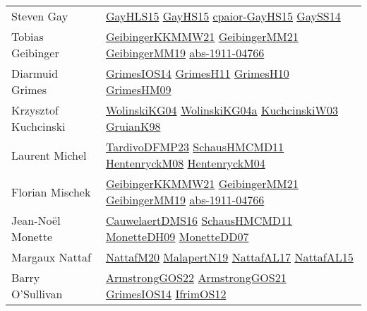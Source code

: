 {\begin{longtable}{p{4cm}p{20cm}}
Steven Gay & \href{papers/GayHLS15.pdf}{GayHLS15}\cite{GayHLS15} \href{papers/GayHS15.pdf}{GayHS15}\cite{GayHS15} \href{papers/cpaior-GayHS15.pdf}{cpaior-GayHS15}\cite{cpaior-GayHS15} \href{papers/GaySS14.pdf}{GaySS14}\cite{GaySS14} \\
Tobias Geibinger & \href{papers/GeibingerKKMMW21.pdf}{GeibingerKKMMW21}\cite{GeibingerKKMMW21} \href{papers/GeibingerMM21.pdf}{GeibingerMM21}\cite{GeibingerMM21} \href{papers/GeibingerMM19.pdf}{GeibingerMM19}\cite{GeibingerMM19} \href{articles/abs-1911-04766.pdf}{abs-1911-04766}\cite{abs-1911-04766} \\
Diarmuid Grimes & \href{articles/GrimesIOS14.pdf}{GrimesIOS14}\cite{GrimesIOS14} \href{papers/GrimesH11.pdf}{GrimesH11}\cite{GrimesH11} \href{papers/GrimesH10.pdf}{GrimesH10}\cite{GrimesH10} \href{papers/GrimesHM09.pdf}{GrimesHM09}\cite{GrimesHM09} \\
Krzysztof Kuchcinski & \href{papers/WolinskiKG04.pdf}{WolinskiKG04}\cite{WolinskiKG04} \href{papers/WolinskiKG04a.pdf}{WolinskiKG04a}\cite{WolinskiKG04a} \href{articles/KuchcinskiW03.pdf}{KuchcinskiW03}\cite{KuchcinskiW03} \href{papers/GruianK98.pdf}{GruianK98}\cite{GruianK98} \\
Laurent Michel & \href{papers/TardivoDFMP23.pdf}{TardivoDFMP23}\cite{TardivoDFMP23} \href{articles/SchausHMCMD11.pdf}{SchausHMCMD11}\cite{SchausHMCMD11} \href{papers/HentenryckM08.pdf}{HentenryckM08}\cite{HentenryckM08} \href{papers/HentenryckM04.pdf}{HentenryckM04}\cite{HentenryckM04} \\
Florian Mischek & \href{papers/GeibingerKKMMW21.pdf}{GeibingerKKMMW21}\cite{GeibingerKKMMW21} \href{papers/GeibingerMM21.pdf}{GeibingerMM21}\cite{GeibingerMM21} \href{papers/GeibingerMM19.pdf}{GeibingerMM19}\cite{GeibingerMM19} \href{articles/abs-1911-04766.pdf}{abs-1911-04766}\cite{abs-1911-04766} \\
Jean{-}No{\"{e}}l Monette & \href{papers/CauwelaertDMS16.pdf}{CauwelaertDMS16}\cite{CauwelaertDMS16} \href{articles/SchausHMCMD11.pdf}{SchausHMCMD11}\cite{SchausHMCMD11} \href{papers/MonetteDH09.pdf}{MonetteDH09}\cite{MonetteDH09} \href{papers/MonetteDD07.pdf}{MonetteDD07}\cite{MonetteDD07} \\
Margaux Nattaf & \href{papers/NattafM20.pdf}{NattafM20}\cite{NattafM20} \href{papers/MalapertN19.pdf}{MalapertN19}\cite{MalapertN19} \href{articles/NattafAL17.pdf}{NattafAL17}\cite{NattafAL17} \href{articles/NattafAL15.pdf}{NattafAL15}\cite{NattafAL15} \\
Barry O'Sullivan & \href{papers/ArmstrongGOS22.pdf}{ArmstrongGOS22}\cite{ArmstrongGOS22} \href{papers/ArmstrongGOS21.pdf}{ArmstrongGOS21}\cite{ArmstrongGOS21} \href{articles/GrimesIOS14.pdf}{GrimesIOS14}\cite{GrimesIOS14} \href{papers/IfrimOS12.pdf}{IfrimOS12}\cite{IfrimOS12} \\

\end{longtable}}
